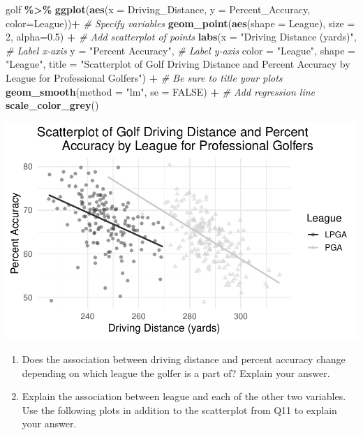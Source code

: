 \documentclass[
]{report}
\newenvironment{Shaded}{\begin{snugshade}}{\end{snugshade}}
\newcommand{\AttributeTok}[1]{\textcolor[rgb]{0.13,0.29,0.53}{#1}}
\newcommand{\CommentTok}[1]{\textcolor[rgb]{0.56,0.35,0.01}{\textit{#1}}}
\newcommand{\ConstantTok}[1]{\textcolor[rgb]{0.56,0.35,0.01}{#1}}
\newcommand{\DecValTok}[1]{\textcolor[rgb]{0.00,0.00,0.81}{#1}}
\newcommand{\FloatTok}[1]{\textcolor[rgb]{0.00,0.00,0.81}{#1}}
\newcommand{\FunctionTok}[1]{\textcolor[rgb]{0.13,0.29,0.53}{\textbf{#1}}}
\newcommand{\NormalTok}[1]{#1}
\newcommand{\SpecialCharTok}[1]{\textcolor[rgb]{0.81,0.36,0.00}{\textbf{#1}}}
\newcommand{\StringTok}[1]{\textcolor[rgb]{0.31,0.60,0.02}{#1}}
\begin{document}
\begin{Shaded}
\begin{Highlighting}[]
\NormalTok{golf }\SpecialCharTok{\%\textgreater{}\%}
  \FunctionTok{ggplot}\NormalTok{(}\FunctionTok{aes}\NormalTok{(}\AttributeTok{x =}\NormalTok{ Driving\_Distance, }\AttributeTok{y =}\NormalTok{ Percent\_Accuracy, }\AttributeTok{color=}\NormalTok{League))}\SpecialCharTok{+}  \CommentTok{\# Specify variables}
  \FunctionTok{geom\_point}\NormalTok{(}\FunctionTok{aes}\NormalTok{(}\AttributeTok{shape =}\NormalTok{ League), }\AttributeTok{size =} \DecValTok{2}\NormalTok{, }\AttributeTok{alpha=}\FloatTok{0.5}\NormalTok{) }\SpecialCharTok{+}  \CommentTok{\# Add scatterplot of points}
  \FunctionTok{labs}\NormalTok{(}\AttributeTok{x =} \StringTok{"Driving Distance (yards)"}\NormalTok{,  }\CommentTok{\# Label x{-}axis}
       \AttributeTok{y =} \StringTok{"Percent Accuracy"}\NormalTok{,  }\CommentTok{\# Label y{-}axis}
       \AttributeTok{color =} \StringTok{"League"}\NormalTok{, }\AttributeTok{shape =} \StringTok{"League"}\NormalTok{,}
       \AttributeTok{title =} \StringTok{"Scatterplot of Golf Driving Distance and Percent }
\StringTok{       Accuracy by League for Professional Golfers"}\NormalTok{) }\SpecialCharTok{+} \CommentTok{\# Be sure to title your plots}
  \FunctionTok{geom\_smooth}\NormalTok{(}\AttributeTok{method =} \StringTok{"lm"}\NormalTok{, }\AttributeTok{se =} \ConstantTok{FALSE}\NormalTok{) }\SpecialCharTok{+} \CommentTok{\# Add regression line}
    \FunctionTok{scale\_color\_grey}\NormalTok{()}
\end{Highlighting}
\end{Shaded}

\begin{center}\includegraphics[width=0.6\linewidth]{13-A29-regression-theory_files/figure-latex/unnamed-chunk-6-1} \end{center}

\begin{enumerate}
\def\labelenumi{\arabic{enumi}.}
\setcounter{enumi}{10}
\item
  Does the association between driving distance and percent accuracy change depending on which league the golfer is a part of? Explain your answer.\\
  \vspace{1in}
\item
  Explain the association between league and each of the other two variables. Use the following plots in addition to the scatterplot from Q11 to explain your answer.
\end{enumerate}
\end{document}
